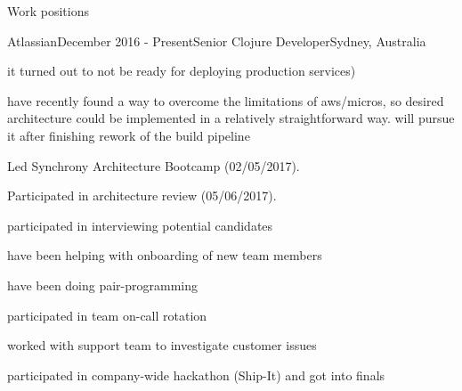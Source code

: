 \documentclass{resume} %
\begin{document}
\begin{rSection}{Work positions}
\begin{rSubsection}{Atlassian}{December 2016 - Present}{Senior Clojure Developer}{Sydney, Australia}
\begin{myList}
\begin{myList}
\begin{myList}
        it turned out to not be ready for deploying production services)
      \item have recently found a way to overcome the limitations of
        aws/micros, so desired architecture could be implemented in a
        relatively straightforward way. will pursue it after finishing
        rework of the build pipeline
      \end{myList}
    \end{myList}
  \item Led Synchrony Architecture Bootcamp (02/05/2017).
  \item Participated in architecture review (05/06/2017).
  \end{myList}
\item participated in interviewing potential candidates
\item have been helping with onboarding of new team members
\item have been doing pair-programming
\item participated in team on-call rotation
\item worked with support team to investigate customer issues
\item participated in company-wide hackathon (Ship-It) and got into finals

~
\end{rSubsection}


\end{rSection}
\end{document}
